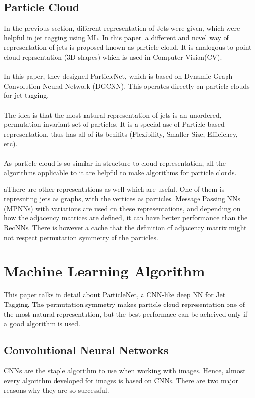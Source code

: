 \subsection{Particle Cloud}
In the previous section, different representation of Jets were given, which were 
helpful in jet tagging using ML. In this paper, a different and novel way of 
representation of jets is proposed known as particle cloud. It is analogous 
to point cloud reprsentation (3D shapes) which is used in Computer Vision(CV).
\\\\
In this paper, they designed ParticleNet, which is based on Dynamic Graph 
Convolution Neural Network (DGCNN). This operates directly on particle clouds 
for jet tagging.
\\\\
The idea is that the most natural representation of jets is an unordered, 
permutation-invariant set of particles. It is a special ase of Particle 
based representation, thus has all of its benifits (Flexibility, Smaller Size, 
Efficiency, etc).
\\\\
As particle cloud is so similar in structure to cloud representation, all the 
algorithms applicable to it are helpful to make algorithms for particle clouds.

\begin{note}
    aThere are other representations as well which are useful. One of them is 
    represnting jets as graphs, with the vertices as particles. Message Passing 
    NNs (MPNNs) with variations are used on these representations, and depending 
    on how the adjacency matrices are defined, it can have better performance 
    than the RecNNs. There is however a cache that the definition of adjacency 
    matrix might not respect permutation symmetry of the particles.
\end{note}

\section{Machine Learning Algorithm}
This paper talks in detail about ParticleNet, a CNN-like deep NN for Jet Tagging. 
The permutation symmetry makes particle cloud representation one of the most 
natural representation, but the best performace can be acheived only if a 
good algorithm is used.

\subsection{Convolutional Neural Networks}
CNNs are the staple algorithm to use when working with images. Hence, almost 
every algorithm developed for images is based on CNNs. There are two major reasons 
why they are so successful.

